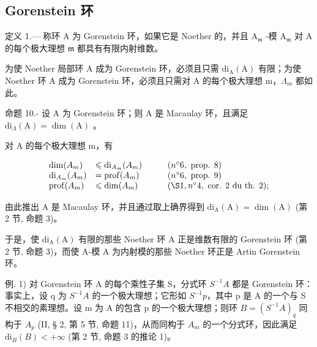 \subsection{Gorenstein 环}

定义 1.--- 称环 A 为 Gorenstein 环，如果它是 Noether 的，并且 \(\mathrm{A}_{\mathfrak{m}}\) -模 \(\mathrm{A}_{\mathfrak{m}}\) 对 A 的每个极大理想 \(\mathfrak{m}\) 都具有有限内射维数。

为使 Noether 局部环 A 成为 Gorenstein 环，必须且只需 \(\mathrm{di}_{\mathrm{A}}(\mathrm{A})\) 有限；为使 Noether 环 A 成为 Gorenstein 环，必须且只需对 A 的每个极大理想 m，\(\Lambda_{m}\) 都如此。

命题 10.- 设 A 为 Gorenstein 环；则 A 是 Macaulay 环，且满足 \(\mathrm{di}_{\Lambda}(\mathrm{A}) = \dim(\mathrm{A})\) 。

对 A 的每个极大理想 m，有

\[
\begin{array}{l l} \dim (A _ {m}) & \leqslant \mathrm{di} _ {A _ {m}} (A _ {m}) \\ \mathrm{di} _ {A _ {m}} (A _ {m}) & = \operatorname{prof} (A _ {m}) \\ \operatorname{prof} (A _ {m}) & \leqslant \dim (A _ {m}) \end{array} \quad \begin{array}{l l} & (n ^ {\circ} 6, \text { prop. } 8) \\ & (n ^ {\circ} 6, \text { prop. } 9) \\ & (\S 1, n ^ {\circ} 4, \text { cor. } 2 \text { du   th. } 2); \end{array}
\]

由此推出 A 是 Macaulay 环，并且通过取上确界得到 \(\mathrm{di}_{\mathrm{A}}(\mathrm{A}) = \dim(\mathrm{A})\) (第 2 节, 命题 3)。

于是，使 \(\mathrm{di}_{\mathrm{A}}(\mathrm{A})\) 有限的那些 Noether 环 A 正是维数有限的 Gorenstein 环 (第 2 节, 命题 3)，而使 A-模 A 为内射模的那些 Noether 环正是 Artin Gorenstein 环。

例. 1) 对 Gorenstein 环 A 的每个乘性子集 S，分式环 \(S^{-1}A\) 都是 Gorenstein 环：事实上，设 q 为 \(S^{-1}A\) 的一个极大理想；它形如 \(S^{-1}p\)，其中 p 是 A 的一个与 S 不相交的素理想。设 m 为 A 的包含 p 的一个极大理想；则环 \(B = (S^{-1}A)_q\) 同构于 \(A_p\) (II, § 2, 第 5 节, 命题 11)，从而同构于 \(A_m\) 的一个分式环，因此满足 \(\text{di}_B(B) < +\infty\) (第 2 节, 命题 3 的推论 1)。

